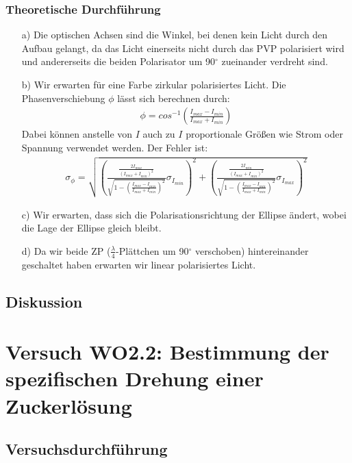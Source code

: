 \documentclass[12pt]{scrartcl}
\begin{document}
\subsubsection{Theoretische Durchführung}
\begin{enumerate}
\item[a)]
Die optischen Achsen sind die Winkel, bei denen kein Licht durch den Aufbau gelangt, da das Licht einerseits nicht durch das PVP polarisiert wird und andererseits die beiden Polarisator um 90$^\circ$ zueinander verdreht sind.
\item[b)]
Wir erwarten für eine Farbe zirkular polarisiertes Licht.
Die Phasenverschiebung $\phi$ lässt sich berechnen durch:
\begin{align}
\phi = cos^{-1}\left(\frac{I_{max}-I_{min}}{I_{max}+I_{min}}\right)
\end{align}
Dabei können anstelle von $I$ auch zu $I$ proportionale Größen wie Strom oder Spannung verwendet werden.
Der Fehler ist:
\begin{align}
\sigma_{\phi} = \sqrt{
\left(\frac{\frac{2I_{max}}{(I_{max}+I_{min})^2}}{\sqrt{1-\left(\frac{I_{max}-I_{min}}{I_{max}+
I_{min}}\right)^2}}\sigma_{I_{min}}\right)^2+
\left(\frac{\frac{2I_{min}}{(I_{max}+I_{min})^2}}{\sqrt{1-\left(\frac{I_{max}-I_{min}}{I_{max}+
I_{min}}\right)^2}}\sigma_{I_{max}}\right)^2}
\end{align}
\item[c)]
Wir erwarten, dass sich die Polarisationsrichtung der Ellipse ändert, wobei die Lage der Ellipse gleich bleibt.
\item[d)]
Da wir beide ZP ($\frac{\lambda}{4}$-Plättchen um 90$^\circ$ verschoben) hintereinander geschaltet haben erwarten wir linear polarisiertes Licht.
\end{enumerate}
\subsection{Diskussion}

\section{Versuch WO2.2:
Bestimmung der spezifischen Drehung einer Zuckerlösung}
\subsection{Versuchsdurchführung}
\end{document}
